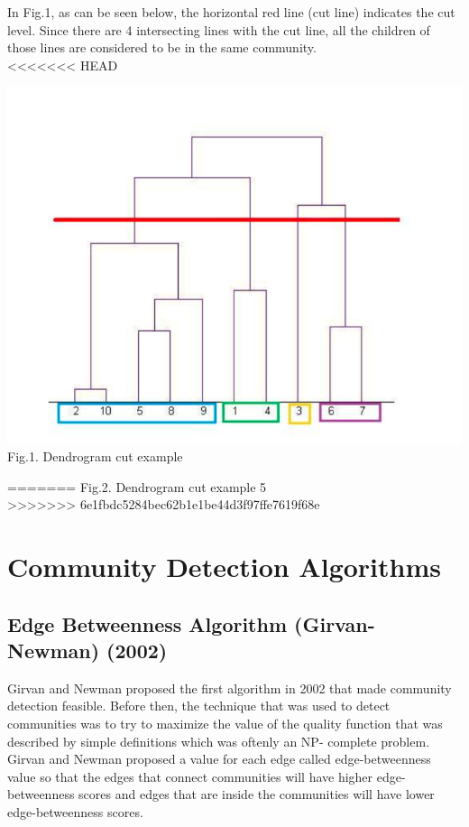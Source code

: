 \documentclass[10pt]{article}
\begin{document}
In Fig.1, as can be seen below, the horizontal red line (cut line) indicates the cut level. Since there are 4 intersecting lines with the cut line, all the children of those lines are considered to be in the same community. \\

<<<<<<< HEAD
\begin{center}
    \includegraphics[scale=0.2]{dendrogram.png} \\
    Fig.1. Dendrogram cut example
\end{center}
=======
Fig.2. Dendrogram cut example 5 \\
>>>>>>> 6e1fbdc5284bec62b1e1be44d3f97ffe7619f68e

\section{Community Detection Algorithms}

\subsection{Edge Betweenness Algorithm (Girvan-Newman) (2002)}

Girvan and Newman proposed the first algorithm in 2002 that made community detection feasible. Before then, the technique that was used to detect communities was to try to maximize the value of the quality function that was described by simple definitions which was oftenly an NP- complete problem. \\

Girvan and Newman proposed a value for each edge called edge-betweenness value so that the edges that connect communities will have higher edge-betweenness scores and edges that are inside the communities will have lower edge-betweenness scores\cite{raghavan}. \\
\end{document}
